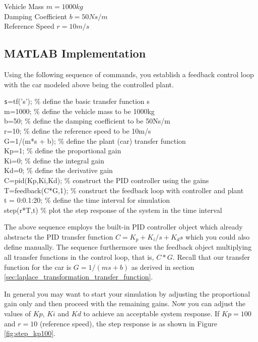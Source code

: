 \documentclass[paper=letter, fontsize=11pt]{scrartcl}
\numberwithin{equation}{section}
\numberwithin{figure}{section}
\numberwithin{table}{section}
\begin{document}
\begin{center}
\begin{framed}
Vehicle Mass $m = 1000 kg$\\
Damping Coefficient $b = 50 Ns/m$\\
Reference Speed $r = 10 m/s$\\
\end{framed}
\end{center}

\subsection{\ac{MATLAB} Implementation}
\label{sec:parameters_cruise_control}
\par
Using the following sequence of commands, you establish a feedback control loop
with the car modeled above being the controlled plant.

\begin{framed}
{\texttt
s=tf('s');         \% define the basic transfer function s\\
m=1000;            \% define the vehicle mass to be 1000kg\\
b=50;              \% define the damping coefficient to be 50Ns/m\\
r=10;              \% define the reference speed to be 10m/s\\
G=1/(m*s + b);     \% define the plant (car) transfer function \\
Kp=1;              \% define the proportional gain\\
Ki=0;              \% define the integral gain\\
Kd=0;              \% define the derivative gain\\
C=pid(Kp,Ki,Kd);   \% construct the PID controller using the gains\\
T=feedback(C*G,1); \% construct the feedback loop with controller and plant\\
t = 0:0.1:20;      \% define the time interval for simulation\\
step(r*T,t)        \% plot the step response of the system in the time interval
}
\end{framed}

\par
The above sequence employs the built-in \ac{PID} controller object which
already abstracts the \ac{PID} transfer function $C = K_{p} + K_{i} / s + K_{d}s$
which you could also define manually. The sequence furthermore uses the feedback
object multiplying all transfer functions in the control loop, that is, $C * G$.
Recall that our transfer function for the car is $G = 1 / (ms + b)$ as derived in section
\ref{sec:laplace_transformation_transfer_function}.
\newline
\par
In general you may want to start your simulation by adjusting the proportional
gain only and then proceed with the remaining gains.
Now you can adjust the values of $Kp$, $Ki$ and $Kd$ to achieve an acceptable
system response. If $Kp = 100$ and $r =10$ (reference speed), the step
response is as shown in Figure \ref{fig:step_kp100}.
\end{document}
